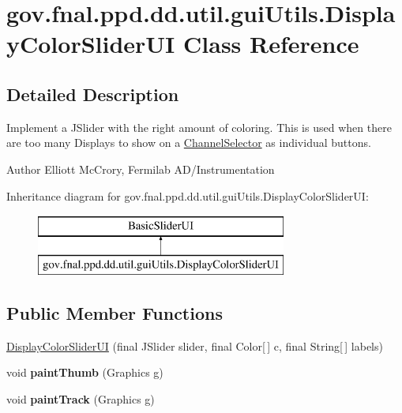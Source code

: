 \hypertarget{classgov_1_1fnal_1_1ppd_1_1dd_1_1util_1_1guiUtils_1_1DisplayColorSliderUI}{\section{gov.\-fnal.\-ppd.\-dd.\-util.\-gui\-Utils.\-Display\-Color\-Slider\-U\-I Class Reference}
\label{classgov_1_1fnal_1_1ppd_1_1dd_1_1util_1_1guiUtils_1_1DisplayColorSliderUI}
}


\subsection{Detailed Description}
Implement a J\-Slider with the right amount of coloring. This is used when there are too many Displays to show on a \hyperlink{classgov_1_1fnal_1_1ppd_1_1dd_1_1ChannelSelector}{Channel\-Selector} as individual buttons.

\begin{DoxyAuthor}{Author}
Elliott Mc\-Crory, Fermilab A\-D/\-Instrumentation 
\end{DoxyAuthor}
Inheritance diagram for gov.\-fnal.\-ppd.\-dd.\-util.\-gui\-Utils.\-Display\-Color\-Slider\-U\-I\-:\begin{figure}[H]
\begin{center}
\leavevmode
\includegraphics[height=2.000000cm]{classgov_1_1fnal_1_1ppd_1_1dd_1_1util_1_1guiUtils_1_1DisplayColorSliderUI}
\end{center}
\end{figure}
\subsection*{Public Member Functions}
\begin{DoxyCompactItemize}
\item 
\hyperlink{classgov_1_1fnal_1_1ppd_1_1dd_1_1util_1_1guiUtils_1_1DisplayColorSliderUI_a450ac978df6b89aaac352c20d5deb32e}{Display\-Color\-Slider\-U\-I} (final J\-Slider slider, final Color\mbox{[}$\,$\mbox{]} c, final String\mbox{[}$\,$\mbox{]} labels)
\item 
\hypertarget{classgov_1_1fnal_1_1ppd_1_1dd_1_1util_1_1guiUtils_1_1DisplayColorSliderUI_a4511f015e848a3c0fc9559d293d35243}{void {\bfseries paint\-Thumb} (Graphics g)}\label{classgov_1_1fnal_1_1ppd_1_1dd_1_1util_1_1guiUtils_1_1DisplayColorSliderUI_a4511f015e848a3c0fc9559d293d35243}

\item 
\hypertarget{classgov_1_1fnal_1_1ppd_1_1dd_1_1util_1_1guiUtils_1_1DisplayColorSliderUI_abcaf76f68e648a8b4b79f37014ab628a}{void {\bfseries paint\-Track} (Graphics g)}\label{classgov_1_1fnal_1_1ppd_1_1dd_1_1util_1_1guiUtils_1_1DisplayColorSliderUI_abcaf76f68e648a8b4b79f37014ab628a}

\end{DoxyCompactItemize}

